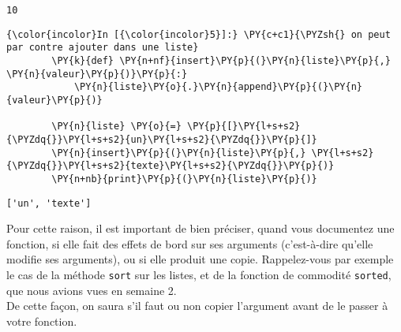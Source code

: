     \begin{Verbatim}[commandchars=\\\{\}]
10

    \end{Verbatim}

    \begin{Verbatim}[commandchars=\\\{\}]
{\color{incolor}In [{\color{incolor}5}]:} \PY{c+c1}{\PYZsh{} on peut par contre ajouter dans une liste}
        \PY{k}{def} \PY{n+nf}{insert}\PY{p}{(}\PY{n}{liste}\PY{p}{,} \PY{n}{valeur}\PY{p}{)}\PY{p}{:}
            \PY{n}{liste}\PY{o}{.}\PY{n}{append}\PY{p}{(}\PY{n}{valeur}\PY{p}{)}
            
        \PY{n}{liste} \PY{o}{=} \PY{p}{[}\PY{l+s+s2}{\PYZdq{}}\PY{l+s+s2}{un}\PY{l+s+s2}{\PYZdq{}}\PY{p}{]}
        \PY{n}{insert}\PY{p}{(}\PY{n}{liste}\PY{p}{,} \PY{l+s+s2}{\PYZdq{}}\PY{l+s+s2}{texte}\PY{l+s+s2}{\PYZdq{}}\PY{p}{)}
        \PY{n+nb}{print}\PY{p}{(}\PY{n}{liste}\PY{p}{)}
\end{Verbatim}


    \begin{Verbatim}[commandchars=\\\{\}]
['un', 'texte']

    \end{Verbatim}

    Pour cette raison, il est important de bien préciser, quand vous
documentez une fonction, si elle fait des effets de bord sur ses
arguments (c'est-à-dire qu'elle modifie ses arguments), ou si elle
produit une copie. Rappelez-vous par exemple le cas de la méthode
\texttt{sort} sur les listes, et de la fonction de commodité
\texttt{sorted}, que nous avions vues en semaine 2.\\

De cette façon, on saura s'il faut ou non copier l'argument avant de le
passer à votre fonction.